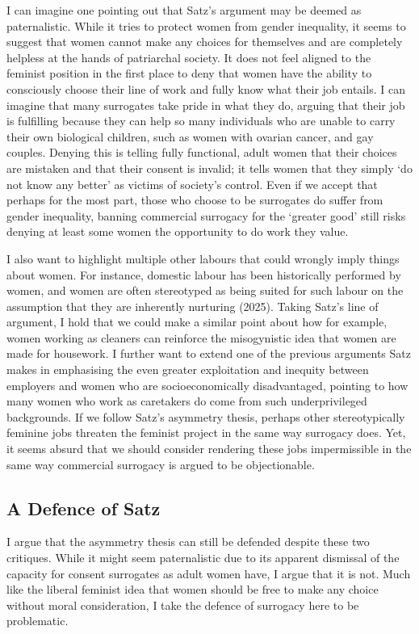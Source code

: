 I can imagine one pointing out that
Satz's argument may be deemed as paternalistic. While it tries to
protect women from gender inequality, it seems to suggest that women
cannot make any choices for themselves and are completely helpless at
the hands of patriarchal society. It does not feel aligned to the
feminist position in the first place to deny that women have the ability
to consciously choose their line of work and fully know what their job
entails. I can imagine that many surrogates take pride in what they do,
arguing that their job is fulfilling because they can help so many
individuals who are unable to carry their own biological children, such
as women with ovarian cancer, and gay couples. Denying this is telling
fully functional, adult women that their choices are mistaken and that
their consent is invalid; it tells women that they simply `do not know
any better' as victims of society's control. Even if we accept that
perhaps for the most part, those who choose to be surrogates do suffer
from gender inequality, banning commercial surrogacy for the `greater
good' still risks denying at least some women the opportunity to do work
they value. 

I also want to highlight multiple other labours that could
wrongly imply things about women. For instance, domestic labour has been
historically performed by women, and women are often stereotyped as
being suited for such labour on the assumption that they are inherently
nurturing (2025). Taking Satz's line of argument, I hold that we could
make a similar point about how for example, women working as cleaners
can reinforce the misogynistic idea that women are made for housework. I
further want to extend one of the previous arguments Satz makes in
emphasising the even greater exploitation and inequity between employers
and women who are socioeconomically disadvantaged, pointing to how many
women who work as caretakers do come from such underprivileged
backgrounds. If we follow Satz's asymmetry thesis, perhaps other
stereotypically feminine jobs threaten the feminist project in the same
way surrogacy does. Yet, it seems absurd that we should consider
rendering these jobs impermissible in the same way commercial surrogacy
is argued to be objectionable. 

\subsection{A Defence of Satz}
  
I argue that
the asymmetry thesis can still be defended despite these two critiques.
While it might seem paternalistic due to its apparent dismissal of the
capacity for consent surrogates as adult women have, I argue that it is
not. Much like the liberal feminist idea that women should be free to
make any choice without moral consideration, I take the defence of
surrogacy here to be problematic. 


